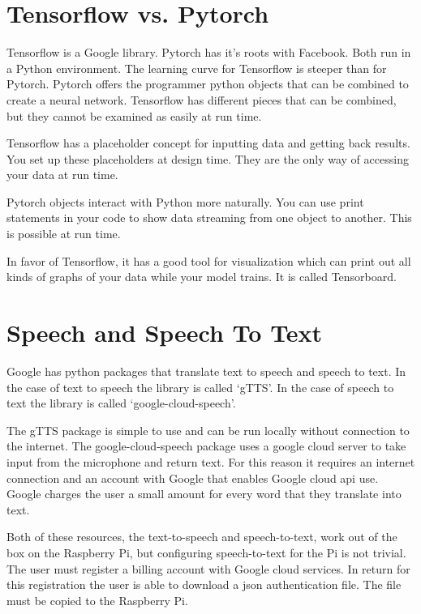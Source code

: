 \section{Tensorflow vs. Pytorch}

Tensorflow is a Google library. Pytorch has it's roots with Facebook. Both run in a Python environment. The learning curve for Tensorflow is steeper than for Pytorch. Pytorch offers the programmer python objects that can be combined to create a neural network. Tensorflow has different pieces that can be combined, but they cannot be examined as easily at run time.

Tensorflow has a placeholder concept for inputting data and getting back results. You set up these placeholders at design time. They are the only way of accessing your data at run time.

Pytorch objects interact with Python more naturally. You can use print statements in your code to show data streaming from one object to another. This is possible at run time.

In favor of Tensorflow, it has a good tool for visualization which can print out all kinds of graphs of your data while your model trains. It is called Tensorboard.

\section{Speech and Speech To Text}

Google has python packages that translate text to speech and speech to text. In the case of text to speech the library is called `gTTS'. In the case of speech to text the library is called `google-cloud-speech'. 

The gTTS package is simple to use and can be run locally without connection to the internet. The google-cloud-speech package uses a google cloud server to take input from the microphone and return text. For this reason it requires an internet connection and an account with Google that enables Google cloud api use. Google charges the user a small amount for every word that they translate into text. 

Both of these resources, the text-to-speech and speech-to-text, work out of the box on the Raspberry Pi, but configuring speech-to-text for the Pi is not trivial. The user must register a billing account with Google cloud services. In return for this registration the user is able to download a json authentication file. The file must be copied to the Raspberry Pi. 

